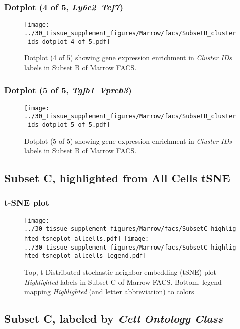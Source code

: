 \clearpage

\subsubsection{Dotplot (4 of 5, \emph{Ly6c2}--\emph{Tcf7})}
\begin{figure}[h]
\centering
\texttt{[image: ../30\_tissue\_supplement\_figures/Marrow/facs/SubsetB\_cluster-ids\_dotplot\_4-of-5.pdf]}

\caption{ Dotplot (4 of 5)  showing gene expression enrichment in \emph{Cluster IDs} labels in Subset B of Marrow FACS. }
\end{figure}


\clearpage

\subsubsection{Dotplot (5 of 5, \emph{Tgfb1}--\emph{Vpreb3})}
\begin{figure}[h]
\centering
\texttt{[image: ../30\_tissue\_supplement\_figures/Marrow/facs/SubsetB\_cluster-ids\_dotplot\_5-of-5.pdf]}

\caption{ Dotplot (5 of 5)  showing gene expression enrichment in \emph{Cluster IDs} labels in Subset B of Marrow FACS. }
\end{figure}


\clearpage
\subsection{Subset C, highlighted from All Cells tSNE}
\subsubsection{t-SNE plot}
\begin{figure}[h]
\centering
\texttt{[image: ../30\_tissue\_supplement\_figures/Marrow/facs/SubsetC\_highlighted\_tsneplot\_allcells.pdf]}
\texttt{[image: ../30\_tissue\_supplement\_figures/Marrow/facs/SubsetC\_highlighted\_tsneplot\_allcells\_legend.pdf]}
\caption{Top, t-Distributed stochastic neighbor embedding (tSNE) plot  \emph{Highlighted} labels in Subset C of Marrow FACS. Bottom, legend mapping \emph{Highlighted} (and letter abbreviation) to colors}
\end{figure}


\clearpage

\subsection{Subset C, labeled by \emph{Cell Ontology Class}}
